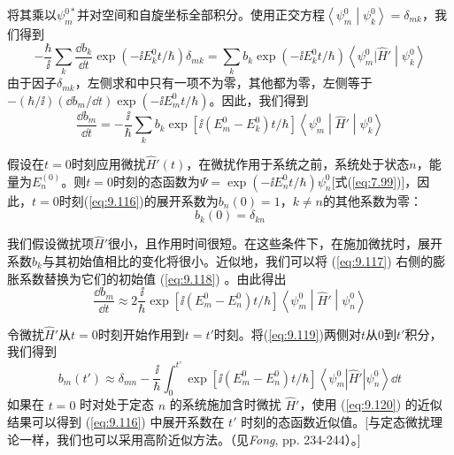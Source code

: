     将其乘以$\psi_m^{0\ast}$并对空间和自旋坐标全部积分。使用正交方程$\left\langle \psi_m^0 \middle| \psi_k^0 \right\rangle = \delta_{mk}$，我们得到
    \begin{equation*}
        -\frac{\hbar}{\ii }\sum_k\frac{\dd b_k}{\dd t}\exp\left(-\ii E_k^0t/\hbar\right)\delta_{mk} = \sum_kb_k\exp\left(-\ii E_k^0t/\hbar\right)\left\langle\psi_m^0|\hat{H}'\middle|\psi_k^0\right\rangle
    \end{equation*}
    由于因子$\delta_{mk}$，左侧求和中只有一项不为零，其他都为零，左侧等于$-\left(\hbar/\ii \right) \left(\dd b_m/\dd t\right) \exp\left(-\ii E_m^0t/\hbar\right)$。因此，我们得到
    \begin{equation}
        \frac{\dd b_m}{\dd t} = -\frac{\ii }{\hbar}\sum_k b_k\exp\left[\ii (E_m^0-E_k^0)t/\hbar\right]\left\langle\psi_m^0\middle|\hat{H}'\middle|\psi_k^0\right\rangle
        \label{eq:9.117}
    \end{equation}

    假设在$t=0$时刻应用微扰$\hat{H}'\left(t\right)$，在微扰作用于系统之前，系统处于状态$n$，能量为$E_n^{\left(0\right)}$。则$t=0$时刻的态函数为$\Psi = \exp{(-\ii E_n^0t/\hbar)}\psi_n^0$[式(\ref{eq:7.99})]，因此，$t=0$时刻(\ref{eq:9.116})的展开系数为$b_n\left(0\right) = 1$，$k \neq n$的其他系数为零：
    \begin{equation}
        b_k\left(0\right) = \delta_{kn}
        \label{eq:9.118}
    \end{equation}

    我们假设微扰项$\hat{H}'$很小，且作用时间很短。在这些条件下，在施加微扰时，展开系数$b_k$与其初始值相比的变化将很小。近似地，我们可以将 (\ref{eq:9.117}) 右侧的膨胀系数替换为它们的初始值 (\ref{eq:9.118}) 。由此得出
    \begin{equation}
        \frac{\dd b_m}{\dd t} \approx 2\frac{\ii }{\hbar}\exp\left[\ii \left(E_m^0-E_n^0\right)t/\hbar\right]\left\langle\psi_m^0\middle|\hat{H}'\middle|\psi_n^0\right\rangle
        \label{eq:9.119}
    \end{equation}

    令微扰$\hat{H}'$从$t=0$时刻开始作用到$t=t'$时刻。将(\ref{eq:9.119})两侧对$t$从$0$到$t'$积分，我们得到
    \begin{equation}
        b_{m}\left(t'\right) \approx \delta_{m n}-\frac{\ii }{\hbar}\int_{0}^{t'} \exp\left[\ii \left(E_{m}^{0}-E_{n}^{0}\right)t/\hbar\right]\left\langle\psi_{m}^{0}\left|\hat{H}'\right| \psi_{n}^{0}\right\rangle \dd t
        \label{eq:9.120}
    \end{equation}
    如果在 $t=0$ 时对处于定态 $n$ 的系统施加含时微扰 $\hat{H}'$，使用 (\ref{eq:9.120}) 的近似结果可以得到 (\ref{eq:9.116}) 中展开系数在 $t'$ 时刻的态函数近似值。[与定态微扰理论一样，我们也可以采用高阶近似方法。（见\textit{Fong}, pp. 234-244）。]

